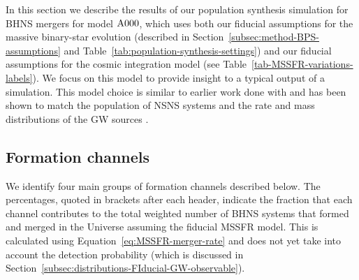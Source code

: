 \documentclass[twocolumn]{aastex63}
\newcommand{\floor}[1]{\textbf{\textcolor{magenta}{[Floor: #1]}}}
\newcommand{\todo}[1]{\textcolor{red}{[To do: #1]}}
\newcommand\rate{\mathcal{R}}
\newcommand\COMPAS{{\sc{COMPAS }}}
\newcommand\bhnsSingle{BHNS\xspace}
\newcommand{\Zi}{\ensuremath{Z_{\rm{i}}}\xspace}
\newcommand{\mAzero}{\ensuremath{\rm{A}000}\xspace}
\begin{document}
In this section we describe the results of our population synthesis simulation for \bhnsSingle mergers for model \mAzero, which uses both our fiducial assumptions for the massive binary-star evolution (described in Section~\ref{subsec:method-BPS-assumptions} and Table~\ref{tab:population-synthesis-settings}) and our fiducial assumptions for the cosmic integration model  (see Table~\ref{tab-MSSFR-variations-labels}). 
We focus  on this model  to provide insight to a typical output of a \COMPAS simulation. 
This model choice is similar to earlier work done with {\COMPAS} and has been shown to match  the population of  \ac{NSNS} systems \citep{2018MNRAS.481.4009V} and the rate and mass distributions of the \ac{GW} sources \citep{2019MNRAS.490.3740N}.  



\subsection{Formation channels}
\label{subsec:bhns-BPS-formationChannels}
%

We identify four main groups of formation channels  described below. 
  The percentages, quoted in brackets after each header, indicate the fraction that each channel contributes to the total weighted number  of \bhnsSingle systems that  formed and merged in the Universe assuming the fiducial \ac{MSSFR} model. This is calculated using Equation~\ref{eq:MSSFR-merger-rate} and does not yet take into account the detection probability (which is discussed in Section~\ref{subsec:distributions-FIducial-GW-observable}). 
%
%
\end{document}
